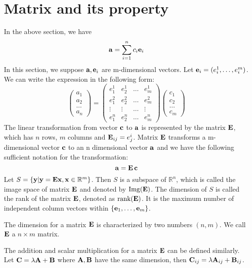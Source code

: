 \section{Matrix and its property}
In the above section, we have 
\begin{equation}
\mathbf{a} = \sum_{i=1}^n c_i \mathbf{e}_i
\end{equation}
In this section, we suppose $\mathbf{a}, \mathbf{e}_i$ are m-dimensional vectors. Let $\mathbf{e}_i = (e_i^1, \dots, e_i^m)$. We can write the expression in the following form:
\begin{equation}
	\begin{pmatrix} a_1 \\ a_2 \\ \dots \\ a_n \end{pmatrix}
	 = \begin{pmatrix} e^1_1 & e^1_2 & \dots & e^1_m \\ e^2_1 & e^2_2 & \dots & e^2_m \\ 
	 	\vdots & \vdots & \dots & \vdots \\
	 	 e^n_1 & e^n_2 & \dots & e^n_m \end{pmatrix} \begin{pmatrix} c_1 \\ c_2 \\ \dots \\ c_m \end{pmatrix}
\end{equation}
The linear transformation from vector $\mathbf{c}$ to $\mathbf{a}$ is represented by the matrix $\mathbf{E}$, which has $n$ rows, $m$ columns and $\mathbf{E}_{ij} = e^i_j$.
Matrix $\mathbf{E}$ transforms a m-dimensional vector $\mathbf{c}$ to an n dimensional vector $\mathbf{a}$ and 
we have the following sufficient notation for the transformation:
\begin{equation}
\mathbf{a} = \mathbf{E}\, \mathbf{c}
\end{equation}
Let $S=\{\mathbf{y} | \mathbf{y} = \mathbf{E}\mathbf{x}, \mathbf{x} \in \mathbb{R}^m\}$. Then $S$ is a subspace of $\mathbb{R}^n$, which is called the image space of matrix $\mathbf{E}$ and denoted by $\mathrm{Img}(\mathbf{E})$. The dimension of $S$ is called the rank of the matrix $\mathbf{E}$, denoted as $\mathrm{rank}(\mathbf{E})$. It is the maximum number of independent column vectors within $\{\mathbf{e}_1, \dots, \mathbf{e}_m\}$.

The dimension for a matrix $\mathbf{E}$ is characterized by two numbers $(n,m)$. We call $\mathbf{E}$  a $n\times m$ matrix.

The addition and scalar multiplication for a matrix $\mathbf{E}$ can be defined similarly. Let $\mathbf{C} = \lambda \mathbf{A} + \mathbf{B}$ where $\mathbf{A}, \mathbf{B}$ have the same dimension, then $\mathbf{C}_{ij} = \lambda \mathbf{A}_{ij} + \mathbf{B}_{ij}$.

